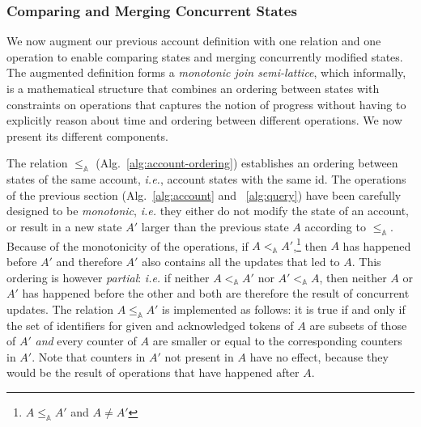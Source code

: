 \documentclass[9pt]{article}   	%
\begin{document}
\subsubsection{Comparing and Merging Concurrent States}
\label{sec:account:ordering-merging}

We now augment our previous account definition with one relation and one operation to enable comparing states and merging concurrently modified states. The augmented definition forms a \textit{monotonic join semi-lattice}, which informally, is a mathematical structure that combines an ordering between states with constraints on operations that captures the notion of progress without having to explicitly reason about time and ordering between different operations. We now present its different components.

The relation $\leq_\mathds{A}$ (Alg.~\ref{alg:account-ordering}) establishes an ordering between states of the same account, \textit{i.e.}, account states with the same id. The operations of the previous section (Alg.~\ref{alg:account} and ~\ref{alg:query}) have been carefully designed to be \textit{monotonic}, \textit{i.e.} they either do not modify the state of an account, or result in a new state $A'$ larger than the previous state $A$ according to $\leq_\mathds{A}$. Because of the monotonicity of the operations, if $A <_\mathds{A} A'$,\footnote{$A \leq_\mathds{A} A'$ and $A \neq A'$} then $A$ has happened before $A'$ and therefore $A'$ also contains all the updates that led to $A$. This ordering is however \textit{partial}: \textit{i.e.} if neither $A <_\mathds{A} A'$ nor $A' <_\mathds{A} A$, then neither $A$ or $A'$ has happened before the other and both are therefore the result of concurrent updates. The relation $A \leq_\mathds{A} A'$ is implemented as follows: it is true if and only if the set of identifiers for given and acknowledged tokens of $A$ are subsets of those of $A'$ \textit{and} every counter of $A$ are smaller or equal to the corresponding counters in $A'$. Note that counters in $A'$ not present in $A$ have no effect, because they would be the result of operations that have happened after $A$. 
\end{document}
